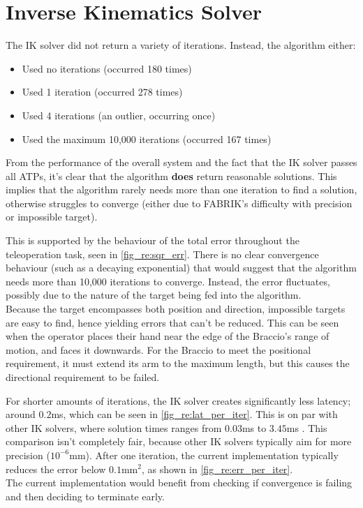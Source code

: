 \newpage
\section{Inverse Kinematics Solver}
The IK solver did not return a variety of iterations. Instead, the algorithm either:
\begin{itemize}[nosep]
    \item Used no iterations (occurred 180 times)
    \item Used 1 iteration (occurred 278 times)
    \item Used 4 iterations (an outlier, occurring once)
    \item Used the maximum 10,000 iterations (occurred 167 times)
\end{itemize}
From the performance of the overall system and the fact that the IK solver passes all ATPs, it's clear that the algorithm \textbf{does} return reasonable solutions. This implies that the algorithm rarely needs more than one iteration to find a solution, otherwise struggles to converge (either due to FABRIK's difficulty with precision or impossible target).

This is supported by the behaviour of the total error throughout the teleoperation task, seen in \autoref{fig_re:sqr_err}. There is no clear convergence behaviour (such as a decaying exponential) that would suggest that the algorithm needs more than 10,000 iterations to converge. Instead, the error fluctuates, possibly due to the nature of the target being fed into the algorithm.\\
Because the target encompasses both position and direction, impossible targets are easy to find, hence yielding errors that can't be reduced. This can be seen when the operator places their hand near the edge of the Braccio's range of motion, and faces it downwards. For the Braccio to meet the positional requirement, it must extend its arm to the maximum length, but this causes the directional requirement to be failed.

For shorter amounts of iterations, the IK solver creates significantly less latency; around $0.2$ms, which can be seen in \autoref{fig_re:lat_per_iter}. This is on par with other IK solvers, where solution times ranges from $0.03$ms to $3.45$ms \cite{bib:TRAC_IK}. This comparison isn't completely fair, because other IK solvers typically aim for more precision ($10^{-6}$mm). After one iteration, the current implementation typically reduces the error below $0.1\text{mm}^2$, as shown in \autoref{fig_re:err_per_iter}.\\
The current implementation would benefit from checking if convergence is failing and then deciding to terminate early.

